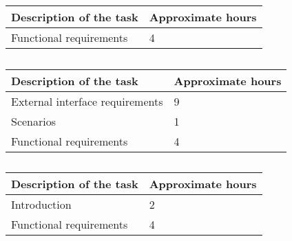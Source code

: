 
%

\subsection{}
\begin{table}[h!]
\begin{tabular}{|l|l|}
\hline
\textbf{Description of the task} & \textbf{Approximate hours} \\ \hline
Functional requirements & 4 \\ \hline
\end{tabular}
\end{table}

\subsection{}
\begin{table}[h!]
\begin{tabular}{|l|l|}
\hline
\textbf{Description of the task} & \textbf{Approximate hours} \\ \hline
External interface requirements & 9 \\ \hline
Scenarios & 1 \\ \hline
Functional requirements & 4 \\ \hline
\end{tabular}
\end{table}

\subsection{}
\begin{table}[h!]
\begin{tabular}{|l|l|}
\hline
\textbf{Description of the task} & \textbf{Approximate hours} \\ \hline
Introduction & 2 \\ \hline
Functional requirements & 4 \\ \hline
\end{tabular}
\end{table}

%